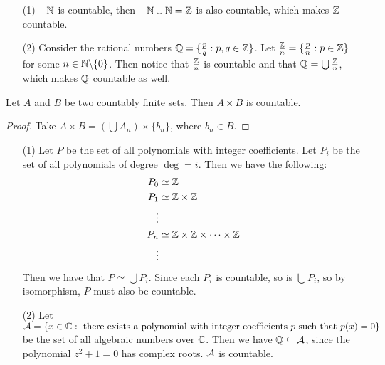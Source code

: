 \begin{example}\label{}
    \begin{enumerate}
        \item[(1)] $-\mathbb{N}$ is countable, then  $-\mathbb{N} \cup \mathbb{N}=\mathbb{Z}$ is also countable,
            which makes $\mathbb{Z}$ countable.

        \item[(2)]  Consider the rational numbers $\mathbb{Q}=\{\frac{p}{q} : p,q \in
            \mathbb{Z}\}$. Let $\frac{\mathbb{Z}}{n}=\{\frac{p}{n} : p \in \mathbb{Z}\}$ for some $n \in
            \mathbb{N}\backslash\{0\}$. Then notice that  $\frac{\mathbb{Z}}{n}$ is countable and
            that $\mathbb{Q}=\bigcup{\frac{\mathbb{Z}}{n}}$, which makes $\mathbb{Q}$ countable as well.
    \end{enumerate}
\end{example}

\begin{lemma}\label{}
    Let $A$ and  $B$ be two countably finite sets. Then  $A \times B$ is
    countable.
\end{lemma}
\begin{proof}
    Take $A \times B=(\bigcup{A_n}) \times \{b_n\}$, where $b_n \in B$.
\end{proof}

\begin{example}\label{}
    \begin{enumerate}
        \item[(1)] Let $P$ be the set of all polynomials with integer
            coefficients. Let  $P_i$ be the set of all polynomials of degree
            $\deg=i$. Then we have the following:
            \begin{align*}
                P_0     &\simeq     \mathbb{Z}      \\
                P_1     &\simeq     \mathbb{Z} \times \mathbb{Z}        \\
                        \vdots              \\
                P_n     &\simeq     \mathbb{Z} \times \mathbb{Z} \times \dots \times \mathbb{Z}        \\
                        \vdots                      \\
            \end{align*}
            Then we have that $P \simeq \bigcup{P_i}$. Since each $P_i$ is
            countable, so is  $\bigcup{P_i}$, so by isomorphism, $P$ must also
            be countable.

        \item[(2)] Let $\mathcal{A}=\{x \in \mathbb{C} : \text{ there exists a polynomial with
                integer coefficients } p \text{ such that } p(x)=0\}$ be the set
                of all algebraic numbers over $\mathbb{C}$. Then we have  $\mathbb{Q} \subseteq
                \mathcal{A}$, since the polynomial $z^2+1=0$ has complex roots. $\mathcal{A}$
                is countable.
    \end{enumerate}
\end{example}


